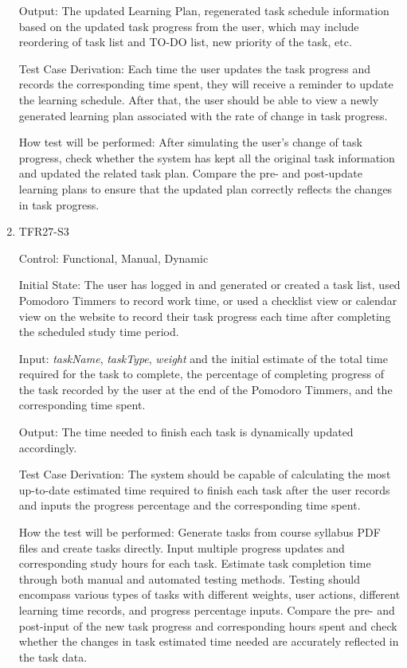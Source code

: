 \documentclass[12pt, titlepage]{article}
\begin{document}
\begin{enumerate}
Output: The updated Learning Plan, regenerated task schedule information based on the updated task progress from the user, which may include reordering of task list and TO-DO list, new priority of the task, etc.

Test Case Derivation: Each time the user updates the task progress and records the corresponding time spent, they will receive a reminder to update the learning schedule. After that, the user should be able to view a newly generated learning plan associated with the rate of change in task progress.
					
How test will be performed: After simulating the user's change of task progress, check whether the system has kept all the original task information and updated the related task plan. Compare the pre- and post-update learning plans to ensure that the updated plan correctly reflects the changes in task progress.

\item{TFR27-S3\\} \label{TFR27-S3}

Control: Functional, Manual, Dynamic
					
Initial State: The user has logged in and generated or created a task list, used Pomodoro Timmers to record work time, or used a checklist view or calendar view on the website to record their task progress each time after completing the scheduled study time period.
					
Input: \textit{taskName}, \textit{taskType}, \textit{weight} and the initial estimate of the total time required for the task to complete, the percentage of completing progress of the task recorded by the user at the end of the Pomodoro Timmers, and the corresponding time spent.
					
Output: The time needed to finish each task is dynamically updated accordingly.

Test Case Derivation: The system should be capable of calculating the most up-to-date estimated time required to finish each task after the user records and inputs the progress percentage and the corresponding time spent.
					
How the test will be performed: Generate tasks from course syllabus PDF files and create tasks directly. Input multiple progress updates and corresponding study hours for each task. Estimate task completion time through both manual and automated testing methods. Testing should encompass various types of tasks with different weights, user actions, different learning time records, and progress percentage inputs. Compare the pre- and post-input of the new task progress and corresponding hours spent and check whether the changes in task estimated time needed are accurately reflected in the task data.


\end{enumerate}
\end{document}
